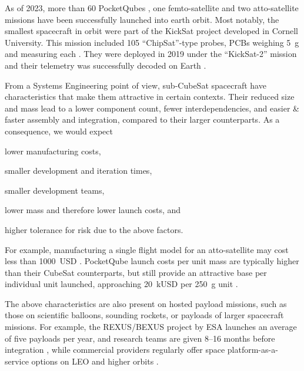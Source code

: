 \documentclass[journal,10pt]{IEEEtran}
\begin{document}
As of 2023, more than 60 PocketQubes \autocite{kuluNanosatsDatabase2023}, one femto-satellite and two atto-satellite missions \autocite{kanavourasCompendiumPocketSizedSpace2023} have been successfully launched into earth orbit. Most notably, the smallest spacecraft in orbit were part of the KickSat project developed in Cornell University. This mission included 105 ``ChipSat''-type probes, \acsp{PCB} weighing \SI{5}{\gram} and measuring  each \autocite{manchesterCentimeterScaleSpacecraftDesign2015}. They were deployed in 2019 under the ``KickSat-2'' mission and their telemetry was successfully decoded on Earth \autocite{abateInexpensiveChipsizeSatellites2019,estevezDetectingSpritesKickSat22019}.


From a Systems Engineering point of view, sub-CubeSat spacecraft have characteristics that make them attractive in certain contexts. Their reduced size and mass lead to a lower component count, fewer interdependencies, and easier \& faster assembly and integration, compared to their larger counterparts.
As a consequence, we would expect
\begin{enumerate*}
	\item lower manufacturing costs,
	\item smaller development and iteration times,
	\item smaller development teams,
	\item lower mass and therefore lower launch costs, and
	\item higher tolerance for risk due to the above factors.
\end{enumerate*}
For example, manufacturing a single flight model for an atto-satellite may cost less than \SI{1000}{USD} \autocite{manchesterCentimeterScaleSpacecraftDesign2015}.
PocketQube launch costs per unit mass are typically higher than their CubeSat counterparts, but still provide an attractive base per individual unit launched, approaching \mbox{\SI{20}{\kilo USD}} per \mbox{\SI{250}{\gram}} unit \autocite{bouwmeesterUtilityConstraintsPocketQubes2020}.

The above characteristics are also present on hosted payload missions, such as those on scientific balloons, sounding rockets, or payloads of larger spacecraft missions. For example, the REXUS/BEXUS project by ESA launches an average of five payloads per year, and research teams are given 8--16 months before integration {\autocite{REXUSBEXUSSchedule}}, while commercial providers regularly offer space platform-as-a-service options on {\acf{LEO}} and higher orbits {\autocite{heinSpaceasaServiceFrameworkTaxonomy2022}}.
\end{document}

